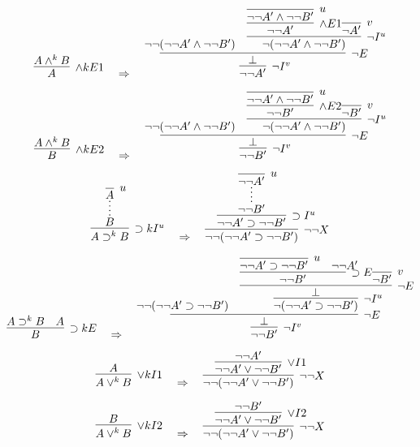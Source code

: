 \documentclass{article}
\begin{document}
\vspace{3em}
\[
\infer[\land kE1]{A}{
  A \land^k B
}
\quad \Rightarrow \quad
\infer[\neg I^{v}]{\neg \neg A'}{ 
  \infer[\neg E]{\perp}{
    \neg \neg (\neg \neg A' \land \neg \neg B')
    \hspace{1em}
    \infer[\neg I^{u}]{\neg (\neg \neg A' \land \neg \neg B')}{
      \infer[\land E1]{\neg \neg A'}{
         {\infer[u]{\neg \neg A' \land \neg \neg B'}{}}
      }
      \infer[v]{\neg A'}{}
    }
  }
}
\]

\vspace{3em}
\[
\infer[\land kE2]{B}{
  A \land^k B
}
\quad \Rightarrow \quad
\infer[\neg I^{v}]{\neg \neg B'}{ 
  \infer[\neg E]{\perp}{
    \neg \neg (\neg \neg A' \land \neg \neg B')
    \hspace{1em}
    \infer[\neg I^{u}]{\neg (\neg \neg A' \land \neg \neg B')}{
      \infer[\land E2]{\neg \neg B'}{
        {\infer[u]{\neg \neg A' \land \neg \neg B'}{}}
      }
      \infer[v]{\neg B'}{}
    }
  }
}
\]

\vspace{3em}
\[
\infer[\supset k I^u]{A \supset^k B}{
  \infer*[]{B}{
    \infer[u]{A}{}
  }
}
\quad \Rightarrow \quad
\infer[\neg \neg X]{\neg \neg(\neg \neg A' \supset \neg \neg B')}{
  \infer[\supset I^u]{\neg \neg A' \supset \neg \neg B'}{
    \infer*[]{\neg \neg B'}{
      \infer[u]{\neg \neg A'}{}
    }
  }
}
\]

\vspace{3em}
\[
\infer[\supset kE]{B}{
  A \supset^k B \quad A
}
\quad \Rightarrow \quad
\infer[\neg I^{v}]{\neg \neg B'}{
  \infer[\neg E]{\perp}{
    \neg \neg (\neg \neg A' \supset \neg \neg B')
    \hspace{1em}
    \infer[\neg I^{u}]{\neg (\neg \neg A' \supset \neg \neg B')}{
      \infer[\neg E]{\perp}{
        \infer[\supset E]{\neg \neg B'}{
          {\infer[u]{\neg \neg A' \supset \neg \neg B'}{}} \quad \neg \neg A'
        }
        \infer[v]{\neg B'}{}
      }
    }
  }
}
\]

\vspace{3em}
\[
\infer[\lor kI1]{A \lor^k B}{A}
\quad \Rightarrow \quad
\infer[\neg \neg X]{\neg \neg(\neg \neg A' \lor \neg \neg B')}{
    \infer[\lor I1]{\neg \neg A' \lor \neg \neg B'}{
        \neg \neg A'
        \infer[]{}{}
    }
}
\]

\vspace{3em}
\[
\infer[\lor kI2]{A \lor^k B}{B}
\quad \Rightarrow \quad
\infer[\neg \neg X]{\neg \neg(\neg \neg A' \lor \neg \neg B')}{
    \infer[\lor I2]{\neg \neg A' \lor \neg \neg B'}{
        \neg \neg B'
        \infer[]{}{}
    }
}
\]
\end{document}
